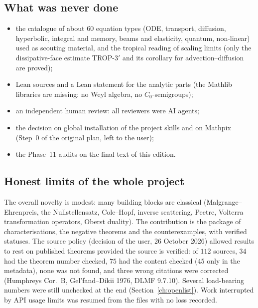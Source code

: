 \subsection{What was never done}

\begin{itemize}
\item the catalogue of about $60$ equation types (ODE, transport, diffusion, hyperbolic, integral and memory, beams and elasticity, quantum, non-linear) used as scouting material, and the tropical reading of scaling limits (only the dissipative-face estimate TROP-3$'$ and its corollary for advection--diffusion are proved);
\item Lean sources and a Lean statement for the analytic parts (the Mathlib libraries are missing: no Weyl algebra, no $C_0$-semigroups);
\item an independent human review: all reviewers were AI agents;
\item the decision on global installation of the project skills and on Mathpix (Step~0 of the original plan, left to the user);
\item the Phase~11 audits on the final text of this edition.
\end{itemize}

\subsection{Honest limits of the whole project}

The overall novelty is modest: many building blocks are classical (Malgrange--Ehrenpreis, the Nullstellensatz, Cole--Hopf, inverse scattering, Peetre, Volterra transformation operators, Oberst duality). The contribution is the package of characterisations, the negative theorems and the counterexamples, with verified statuses. The source policy (decision of the user, 26 October 2026) allowed results to rest on published theorems provided the source is verified: of $112$ sources, $34$ had the theorem number checked, $75$ had the content checked ($45$ only in the metadata), none was not found, and three wrong citations were corrected (Humphreys Cor.~B, Gel'fand--Dikii 1976, DLMF 9.7.10). Several load-bearing numbers were still unchecked at the end (Section~\ref{ch:openlist}). Work interrupted by API usage limits was resumed from the files with no loss recorded.
